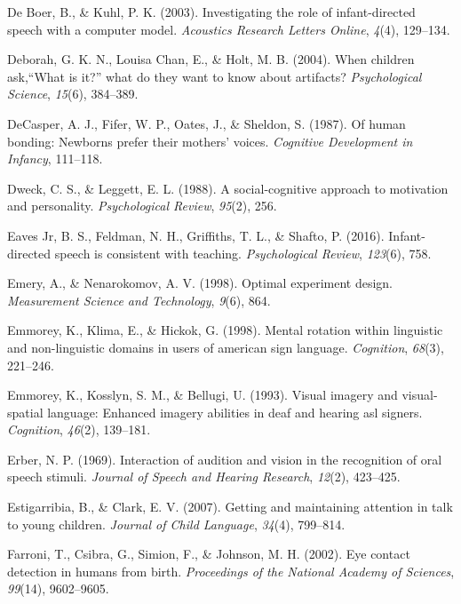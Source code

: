 \documentclass[oneside]{report}
\begin{document}
\hypertarget{ref-de2003investigating}{}
De Boer, B., \& Kuhl, P. K. (2003). Investigating the role of
infant-directed speech with a computer model. \emph{Acoustics Research
Letters Online}, \emph{4}(4), 129--134.

\hypertarget{ref-deborah2004children}{}
Deborah, G. K. N., Louisa Chan, E., \& Holt, M. B. (2004). When children
ask,``What is it?'' what do they want to know about artifacts?
\emph{Psychological Science}, \emph{15}(6), 384--389.

\hypertarget{ref-decasper1987human}{}
DeCasper, A. J., Fifer, W. P., Oates, J., \& Sheldon, S. (1987). Of
human bonding: Newborns prefer their mothers' voices. \emph{Cognitive
Development in Infancy}, 111--118.

\hypertarget{ref-dweck1988social}{}
Dweck, C. S., \& Leggett, E. L. (1988). A social-cognitive approach to
motivation and personality. \emph{Psychological Review}, \emph{95}(2),
256.

\hypertarget{ref-eaves2016infant}{}
Eaves Jr, B. S., Feldman, N. H., Griffiths, T. L., \& Shafto, P. (2016).
Infant-directed speech is consistent with teaching. \emph{Psychological
Review}, \emph{123}(6), 758.

\hypertarget{ref-emery1998optimal}{}
Emery, A., \& Nenarokomov, A. V. (1998). Optimal experiment design.
\emph{Measurement Science and Technology}, \emph{9}(6), 864.

\hypertarget{ref-emmorey1998mental}{}
Emmorey, K., Klima, E., \& Hickok, G. (1998). Mental rotation within
linguistic and non-linguistic domains in users of american sign
language. \emph{Cognition}, \emph{68}(3), 221--246.

\hypertarget{ref-emmorey1993visual}{}
Emmorey, K., Kosslyn, S. M., \& Bellugi, U. (1993). Visual imagery and
visual-spatial language: Enhanced imagery abilities in deaf and hearing
asl signers. \emph{Cognition}, \emph{46}(2), 139--181.

\hypertarget{ref-erber1969interaction}{}
Erber, N. P. (1969). Interaction of audition and vision in the
recognition of oral speech stimuli. \emph{Journal of Speech and Hearing
Research}, \emph{12}(2), 423--425.

\hypertarget{ref-estigarribia2007getting}{}
Estigarribia, B., \& Clark, E. V. (2007). Getting and maintaining
attention in talk to young children. \emph{Journal of Child Language},
\emph{34}(4), 799--814.

\hypertarget{ref-farroni2002eye}{}
Farroni, T., Csibra, G., Simion, F., \& Johnson, M. H. (2002). Eye
contact detection in humans from birth. \emph{Proceedings of the
National Academy of Sciences}, \emph{99}(14), 9602--9605.
\end{document}
